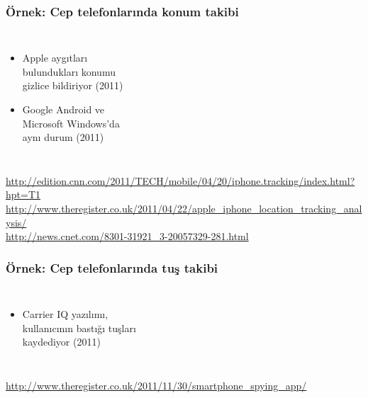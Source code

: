 \documentclass[dvipsnames]{beamer}
\theoremstyle{definition}
\theoremstyle{example}
\theoremstyle{plain}
\begin{document}
\begin{frame}
  \frametitle{Örnek: Cep telefonlarında konum takibi}

  \begin{columns}

    \begin{itemize}
      \item Apple aygıtları\\
        bulundukları konumu\\
        gizlice bildiriyor (2011)
      \item Google Android ve\\
        Microsoft Windows'da\\
        aynı durum (2011)
    \end{itemize}
  \end{columns}

  \medskip
  \tiny{\url{http://edition.cnn.com/2011/TECH/mobile/04/20/iphone.tracking/index.html?hpt=T1}}\\
  \tiny{\url{http://www.theregister.co.uk/2011/04/22/apple_iphone_location_tracking_analysis/}}\\
  \tiny{\url{http://news.cnet.com/8301-31921_3-20057329-281.html}}\\
\end{frame}

\begin{frame}
  \frametitle{Örnek: Cep telefonlarında tuş takibi}

  \begin{columns}

    \begin{itemize}
      \item Carrier IQ yazılımı,\\
        kullanıcının bastığı tuşları\\
        kaydediyor (2011)
    \end{itemize}
  \end{columns}

  \medskip
  \tiny{\url{http://www.theregister.co.uk/2011/11/30/smartphone_spying_app/}}\\
\end{frame}
\end{document}

